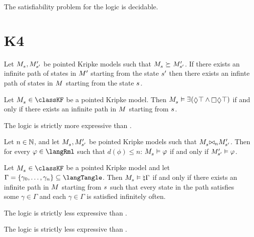 \begin{corollary}
The satisfiability problem for the logic \logicRmlS{} is decidable.
\end{corollary}

\section{K4}

\begin{lemma}
Let $\kPModel{\kStateS}, \kPModelP{\kStateSP}$ be pointed Kripke models such that $\kPModel{\kStateS} \simulates \kPModelP{\kStateSP}$.
If there exists an infinite path of states in ${M^{\prime}_{}}$ starting from the state ${s}^{\prime}$ then there exists an infinte path of states in $\kModel$ starting from the state $\kStateS$.
\end{lemma}


\begin{lemma}
Let $\kPModel{\kStateS} \in \classKF$ be a pointed Kripke model.
Then $\kPModel{\kStateS} \entails \somerefs(\possible \top \land \necessary \possible \top)$ if and only if there exists an infinite path in $\kModel$ starting from $\kStateS$.
\end{lemma}


\begin{theorem}
The logic \logicRmlKF{} is strictly more expressive than \logicKF{}.
\end{theorem}


\begin{lemma}
    Let $n \in \mathbb{N}$, and let $\kPModel{\kStateS}, \kPModelP{\kStateSP}$ be pointed Kripke models such that $\kPModel{\kStateS} \mutualrefines[n] \kPModelP{\kStateSP}$.
    Then for every $\phi \in \langRml$ such that $d(\phi) \leq n$: $\kPModel{\kStateS} \entails \phi$ if and only if ${M^{\prime}_{{s}^{\prime}}} \vDash \varphi$.
\end{lemma}


\begin{lemma}
Let $\kPModel{\kStateS} \in \classKF$ be a pointed Kripke model and let $\Gamma = \{\gamma_0, \dots, \gamma_n\} \subseteq \langTangle$.
Then $\kPModel{\kStateS} \entails \tangle \Gamma$ if and only if there exists an infinite path in $\kModel$ starting from $\kStateS$ such that every state in the path satisfies some $\gamma \in \Gamma$ and each $\gamma \in \Gamma$ is satisfied infinitely often.
\end{lemma}


\begin{theorem}
The logic \logicRmlKF{} is strictly less expressive than \logicTangleKF{}.
\end{theorem}


\begin{corollary}
The logic \logicRmlKF{} is strictly less expressive than \logicMuKF{}.
\end{corollary}


